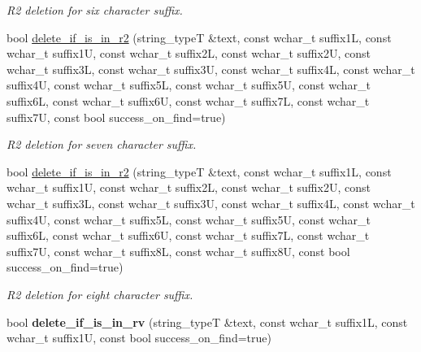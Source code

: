 \begin{DoxyCompactItemize}
\begin{DoxyCompactList}\small\item\em R2 deletion for six character suffix. \end{DoxyCompactList}\item 
\hypertarget{classstemming_1_1stem_a9542e67a264c728cfb636767dc75a07c}{bool \hyperlink{classstemming_1_1stem_a9542e67a264c728cfb636767dc75a07c}{delete\+\_\+if\+\_\+is\+\_\+in\+\_\+r2} (string\+\_\+type\+T \&text, const wchar\+\_\+t suffix1\+L, const wchar\+\_\+t suffix1\+U, const wchar\+\_\+t suffix2\+L, const wchar\+\_\+t suffix2\+U, const wchar\+\_\+t suffix3\+L, const wchar\+\_\+t suffix3\+U, const wchar\+\_\+t suffix4\+L, const wchar\+\_\+t suffix4\+U, const wchar\+\_\+t suffix5\+L, const wchar\+\_\+t suffix5\+U, const wchar\+\_\+t suffix6\+L, const wchar\+\_\+t suffix6\+U, const wchar\+\_\+t suffix7\+L, const wchar\+\_\+t suffix7\+U, const bool success\+\_\+on\+\_\+find=true)}\label{classstemming_1_1stem_a9542e67a264c728cfb636767dc75a07c}

\begin{DoxyCompactList}\small\item\em R2 deletion for seven character suffix. \end{DoxyCompactList}\item 
\hypertarget{classstemming_1_1stem_a9bbc2192839ce8ebcf88d0220cfa2441}{bool \hyperlink{classstemming_1_1stem_a9bbc2192839ce8ebcf88d0220cfa2441}{delete\+\_\+if\+\_\+is\+\_\+in\+\_\+r2} (string\+\_\+type\+T \&text, const wchar\+\_\+t suffix1\+L, const wchar\+\_\+t suffix1\+U, const wchar\+\_\+t suffix2\+L, const wchar\+\_\+t suffix2\+U, const wchar\+\_\+t suffix3\+L, const wchar\+\_\+t suffix3\+U, const wchar\+\_\+t suffix4\+L, const wchar\+\_\+t suffix4\+U, const wchar\+\_\+t suffix5\+L, const wchar\+\_\+t suffix5\+U, const wchar\+\_\+t suffix6\+L, const wchar\+\_\+t suffix6\+U, const wchar\+\_\+t suffix7\+L, const wchar\+\_\+t suffix7\+U, const wchar\+\_\+t suffix8\+L, const wchar\+\_\+t suffix8\+U, const bool success\+\_\+on\+\_\+find=true)}\label{classstemming_1_1stem_a9bbc2192839ce8ebcf88d0220cfa2441}

\begin{DoxyCompactList}\small\item\em R2 deletion for eight character suffix. \end{DoxyCompactList}\item 
\hypertarget{classstemming_1_1stem_a3754d998db70ac20861ab3e87c3e5f25}{bool {\bfseries delete\+\_\+if\+\_\+is\+\_\+in\+\_\+rv} (string\+\_\+type\+T \&text, const wchar\+\_\+t suffix1\+L, const wchar\+\_\+t suffix1\+U, const bool success\+\_\+on\+\_\+find=true)}\label{classstemming_1_1stem_a3754d998db70ac20861ab3e87c3e5f25}


\end{DoxyCompactItemize}

